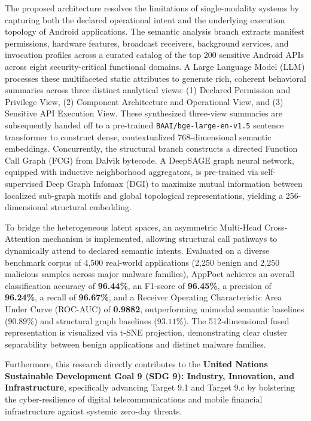 \documentclass[12pt,a4paper,oneside]{report}
\begin{document}
The proposed architecture resolves the limitations of single-modality systems by capturing both the declared operational intent and the underlying execution topology of Android applications. The semantic analysis branch extracts manifest permissions, hardware features, broadcast receivers, background services, and invocation profiles across a curated catalog of the top 200 sensitive Android APIs across eight security-critical functional domains. A Large Language Model (LLM) processes these multifaceted static attributes to generate rich, coherent behavioral summaries across three distinct analytical views: (1) Declared Permission and Privilege View, (2) Component Architecture and Operational View, and (3) Sensitive API Execution View. These synthesized three-view summaries are subsequently handed off to a pre-trained \texttt{BAAI/bge-large-en-v1.5} sentence transformer to construct dense, contextualized 768-dimensional semantic embeddings. Concurrently, the structural branch constructs a directed Function Call Graph (FCG) from Dalvik bytecode. A DeepSAGE graph neural network, equipped with inductive neighborhood aggregators, is pre-trained via self-supervised Deep Graph Infomax (DGI) to maximize mutual information between localized sub-graph motifs and global topological representations, yielding a 256-dimensional structural embedding. 

To bridge the heterogeneous latent spaces, an asymmetric Multi-Head Cross-Attention mechanism is implemented, allowing structural call pathways to dynamically attend to declared semantic intents. Evaluated on a diverse benchmark corpus of 4,500 real-world applications (2,250 benign and 2,250 malicious samples across major malware families), AppPoet achieves an overall classification accuracy of \textbf{96.44\%}, an F1-score of \textbf{96.45\%}, a precision of \textbf{96.24\%}, a recall of \textbf{96.67\%}, and a Receiver Operating Characteristic Area Under Curve (ROC-AUC) of \textbf{0.9882}, outperforming unimodal semantic baselines ($90.89\%$) and structural graph baselines ($93.11\%$). The 512-dimensional fused representation is visualized via t-SNE projection, demonstrating clear cluster separability between benign applications and distinct malware families. 

Furthermore, this research directly contributes to the \textbf{United Nations Sustainable Development Goal 9 (SDG 9): Industry, Innovation, and Infrastructure}, specifically advancing Target 9.1 and Target 9.c by bolstering the cyber-resilience of digital telecommunications and mobile financial infrastructure against systemic zero-day threats.
\end{document}
